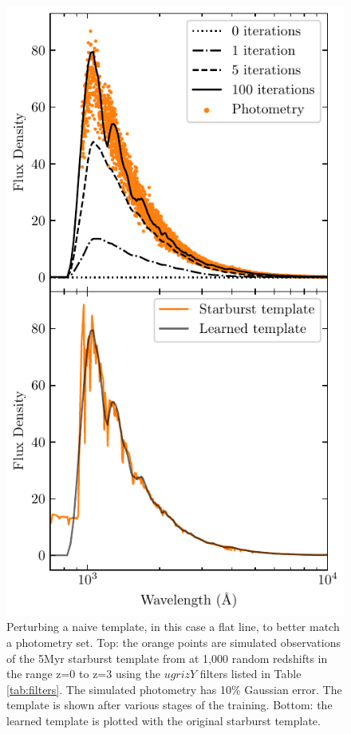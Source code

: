 \documentclass[twocolumn]{aastex63}
\begin{document}
    \begin{figure}
        \centering
        \includegraphics{training_example.pdf}
        \caption{Perturbing a naive template, in this case a flat line, to better match a photometry set. Top: the orange points are simulated observations of the 5Myr starburst template from \citet{Coe2006a} at 1,000 random redshifts in the range z=0 to z=3 using the $ugrizY$ filters listed in Table \ref{tab:filters}. The simulated photometry has 10\% Gaussian error. The template is shown after various stages of the training. Bottom: the learned template is plotted with the original starburst template.}
        \label{fig:pert_ex}
    \end{figure}
\end{document}
